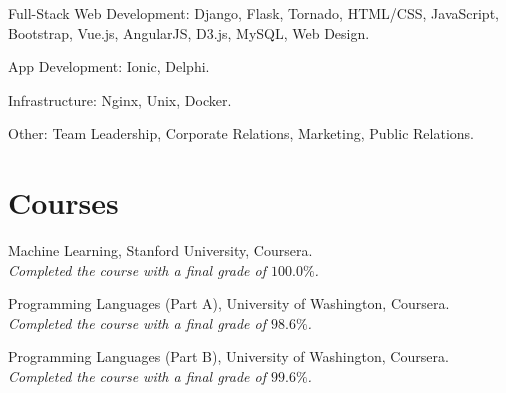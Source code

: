 \documentclass[letterpaper]{article}
\renewenvironment{itemize}{
  \begin{list}{}{
    \setlength{\leftmargin}{1.5em}
  }
}{
  \end{list}
}
\begin{document}
\begin{itemize}
  \item Full-Stack Web Development: Django, Flask, Tornado, HTML/CSS, JavaScript, Bootstrap, Vue.js, AngularJS, D3.js, MySQL, Web Design.

  \item App Development: Ionic, Delphi.

  \item Infrastructure: Nginx, Unix, Docker.

  \item Other: Team Leadership, Corporate Relations, Marketing, Public Relations.
\end{itemize}

\section*{Courses}

\begin{itemize}
  \item Machine Learning, Stanford University, Coursera.\\
  \emph{Completed the course with a final grade of $100.0\%$.}

  \item Programming Languages (Part A), University of Washington, Coursera.\\
  \emph{Completed the course with a final grade of $98.6\%$.}

  \item Programming Languages (Part B), University of Washington, Coursera.\\
  \emph{Completed the course with a final grade of $99.6\%$.}
\end{itemize}


\bigskip

\end{document}
